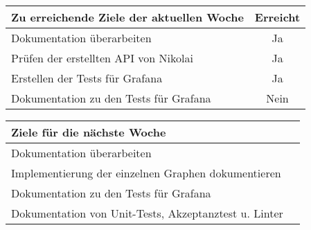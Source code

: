 \begin{tabularx}{\textwidth}{Xc}
    \arrayrulecolor{OliveGreen}
    \toprule
    {\bfseries Zu erreichende Ziele der aktuellen Woche} & {\bfseries Erreicht} \\
    \midrule[2pt]
    Dokumentation überarbeiten                              &Ja              \\
    \rowcolor{OliveGreen!15}
    Prüfen der erstellten API von Nikolai                   &Ja              \\
    \rowcolor{White}
    Erstellen der Tests für Grafana                         &Ja              \\
    \rowcolor{OliveGreen!15}
    Dokumentation zu den Tests für Grafana                &Nein              \\
   \bottomrule[2pt]
\end{tabularx}
%
\vspace{1cm}
%
\begin{tabularx}{\textwidth}{Xc}
    \arrayrulecolor{OliveGreen}
    \toprule
    {\bfseries Ziele für die nächste Woche}        &                         \\
    \midrule[2pt]
    Dokumentation überarbeiten                     &                         \\
    \rowcolor{OliveGreen!15}
    Implementierung der einzelnen Graphen dokumentieren   &                  \\
    \rowcolor{White}
    Dokumentation zu den Tests für Grafana         &                         \\
    \rowcolor{OliveGreen!15}
    Dokumentation von Unit-Tests, Akzeptanztest u. Linter &                  \\
\end{tabularx}
